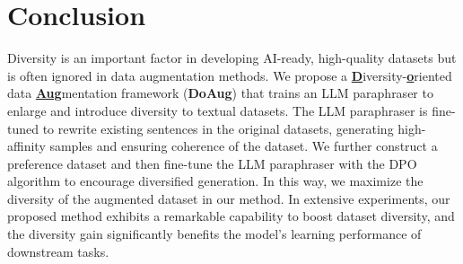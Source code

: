 
\section{Conclusion}
\vspace{-1mm}
Diversity is an important factor in developing AI-ready, high-quality datasets but is often ignored in data augmentation methods. 
We propose a \textbf{\underline{D}}iversity-\textbf{\underline{o}}riented data \textbf{\underline{Aug}}mentation framework (\textbf{DoAug}) that trains an LLM paraphraser to enlarge and introduce diversity to textual datasets. 
The LLM paraphraser is fine-tuned to rewrite existing sentences in the original datasets, generating high-affinity samples and ensuring coherence of the dataset. 
We further construct a preference dataset and then fine-tune the LLM paraphraser with the DPO algorithm to encourage diversified generation. 
In this way, we maximize the diversity of the augmented dataset in our method. 
In extensive experiments, our proposed method exhibits a remarkable capability to boost dataset diversity, and the diversity gain significantly benefits the model's learning performance of downstream tasks.